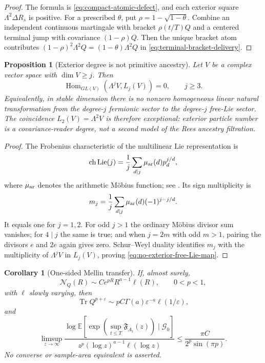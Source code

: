 \documentclass[10pt,reqno]{amsart}
\theoremstyle{plain}
\newtheorem{proposition}[theorem]{Proposition}
\newtheorem{corollary}[theorem]{Corollary}
\theoremstyle{definition}
\theoremstyle{remark}
\begin{document}
\begin{proof}
The formula is \eqref{eq:compact-atomic-defect}, and each exterior square
$\Lambda^2\Delta R_s$ is positive.  For a prescribed $\theta$, put
$\rho=1-\sqrt{1-\theta}$.  Combine an independent continuous martingale with
bracket $\rho(t/T)Q$ and a centered terminal jump with covariance
$(1-\rho)Q$.  Then the unique bracket atom contributes
$(1-\rho)^2\Lambda^2Q=(1-\theta)\Lambda^2Q$ in
\eqref{eq:terminal-bracket-delivery}.
\end{proof}

\begin{proposition}[Exterior degree is not primitive ancestry]
\label{prop:exterior-free-Lie-obstruction}
Let $V$ be a complex vector space with $\dim V\ge j$.  Then
\begin{equation}
 \operatorname{Hom}_{GL(V)}(\Lambda^jV,L_j(V))=0,
 \qquad j\ge3.
 \label{eq:no-exterior-free-Lie-map}
\end{equation}
Equivalently, in stable dimension there is no nonzero homogeneous linear
natural transformation from the degree-$j$ fermionic sector to the
degree-$j$ free-Lie sector.  The coincidence $L_2(V)=\Lambda^2V$ is therefore
exceptional: exterior particle number is a covariance-reader degree, not a
second model of the Rees ancestry filtration.
\end{proposition}

\begin{proof}
The Frobenius characteristic of the multilinear Lie representation is
\[
 \operatorname{ch}\operatorname{Lie}(j)
 =\frac1j\sum_{d\mid j}\mu_{\rm ar}(d)p_d^{j/d},
\]
where $\mu_{\rm ar}$ denotes the arithmetic M\"obius function;
see \cite{Reutenauer93}.  Its sign multiplicity is
\[
 m_j=\frac1j\sum_{d\mid j}\mu_{\rm ar}(d)(-1)^{j-j/d}.
\]
It equals one for $j=1,2$.  For odd $j>1$ the ordinary M\"obius divisor sum
vanishes; for $4\mid j$ the same is true; and when $j=2m$ with odd $m>1$,
pairing the divisors $e$ and $2e$ again gives zero.  Schur--Weyl duality
identifies $m_j$ with the multiplicity of $\Lambda^jV$ in $L_j(V)$, proving
\eqref{eq:no-exterior-free-Lie-map}.
\end{proof}

\begin{corollary}[One-sided Mellin transfer]
\label{cor:compact-revealed-mellin}
If, almost surely,
\[
 \mathcal N_Q(R)\sim Ce^{pR}R^{a-1}\ell(R),
 \qquad 0<p<1,
\]
with $\ell$ slowly varying, then
\[
 \operatorname{Tr}Q^{p+\varepsilon}
 \sim pC\Gamma(a)\varepsilon^{-a}\ell(1/\varepsilon),
\]
and
\[
 \limsup_{z\to\infty}
 \frac{\log\mathbb E[\exp(\sup_{t\le T}\mathfrak F_{A_t}(z))
       \mid\mathcal G_0]}
      {z^p(\log z)^{a-1}\ell(\log z)}
 \le \frac{\pi C}{2^p\sin(\pi p)}.
\]
No converse or sample-area equivalent is asserted.
\end{corollary}
\end{document}
